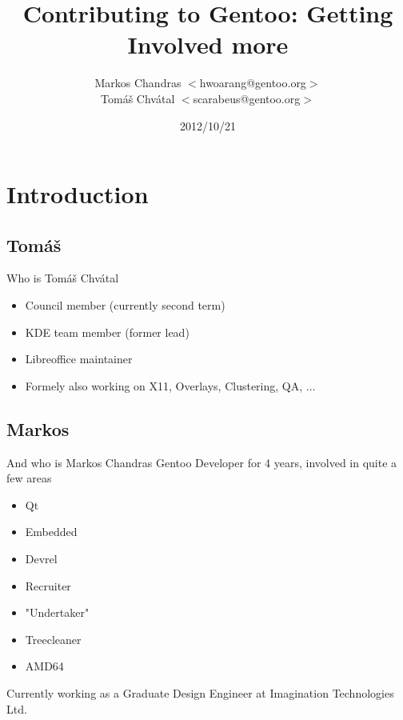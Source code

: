 \documentclass{beamer}
\title{Contributing to Gentoo: Getting Involved more}
\author[Markos Chandras \& Tomáš Chvátal]{Markos Chandras $<$hwoarang@gentoo.org$>$ \\ Tomáš Chvátal $<$scarabeus@gentoo.org$>$}
\date{2012/10/21}
\begin{document}
\frame{\titlepage}
\section{Introduction}

\subsection{Tomáš}

\begin{frame}{Who is Tomáš Chvátal}
	\begin{itemize}
		\item Council member (currently second term)
		\item KDE team member (former lead)
		\item Libreoffice maintainer
		\item Formely also working on X11, Overlays, Clustering, QA, ...
	\end{itemize}
\end{frame}

\subsection{Markos}
\begin{frame}{And who is Markos Chandras}
Gentoo Developer for 4 years, involved in quite a few areas
\begin{itemize}
	\item Qt
	\item Embedded
	\item Devrel
	\item Recruiter
	\item "Undertaker"
	\item Treecleaner
	\item AMD64
\end{itemize}
Currently working as a Graduate Design Engineer at Imagination Technologies Ltd.
\end{frame}
\end{document}
